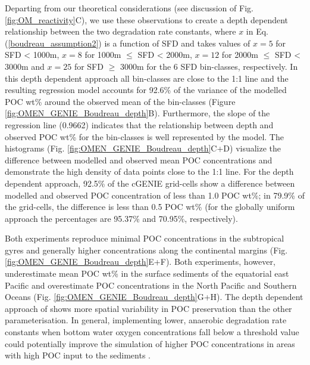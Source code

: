 \documentclass[gmd, manuscript]{copernicus}
\begin{document}
Departing from our theoretical considerations (see discussion of Fig. \ref{fig:OM_reactivity}C), we use these observations to create a depth dependent relationship between the two degradation rate constants, where $x$ in Eq. (\ref{boudreau_assumption2}) is a function of SFD and takes values of $x=5$ for SFD < 1000m, $x=8$ for 1000m $\leq$ SFD < 2000m, 
$x=12$ for 2000m $\leq$ SFD < 3000m and $x=25$ for SFD $\geq$ 3000m for the 6 SFD bin-classes, respectively. 
In this depth dependent approach all bin-classes are close to the 1:1 line and the resulting regression model accounts for 92.6\% of the variance of the modelled POC wt\% around the observed mean of the bin-classes (Figure \ref{fig:OMEN_GENIE_Boudreau_depth}B). 
Furthermore, the slope of the regression line (0.9662) indicates that the relationship between depth and observed POC wt\% for the bin-classes is well represented by the model. 
The histograms (Fig. \ref{fig:OMEN_GENIE_Boudreau_depth}C+D) visualize the difference between modelled and observed mean POC concentrations and demonstrate the high density of data points close to the 1:1 line. 
For the depth dependent approach, 92.5\% of the cGENIE grid-cells show a difference between modelled and observed POC concentration of less than 1.0 POC wt\%; in 79.9\% of the grid-cells, the difference is less than 0.5 POC wt\% 
(for the globally uniform approach the percentages are 95.37\% and 70.95\%, respectively). 

Both experiments reproduce minimal POC concentrations in the subtropical gyres and generally higher concentrations along the continental margins (Fig. \ref{fig:OMEN_GENIE_Boudreau_depth}E+F). 
Both experiments, however, underestimate mean POC wt\% in the surface sediments of the equatorial east Pacific and overestimate POC concentrations 
in the North Pacific and Southern Oceans (Fig. \ref{fig:OMEN_GENIE_Boudreau_depth}G+H). 
The depth dependent approach of \citet{boudreau1997diagenetic} shows more spatial variability in POC preservation than the other parameterisation. 
In general, implementing lower, anaerobic degradation rate constants when bottom water oxygen concentrations fall below a threshold value could potentially improve the simulation of higher POC concentrations in areas with high POC input to the 
sediments \citep{palastanga_long_term_2011}. 

\end{document}
